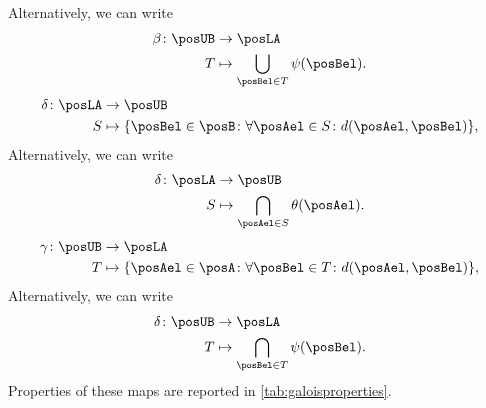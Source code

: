 %
\noindent Alternatively, we can write
\begin{equation}
	\begin{aligned}
		\beta \colon \posUB & \to \posLA                                    \\
		T                   & \mapsto \bigcup_{\posBel\in T} \psi(\posBel).
	\end{aligned}
\end{equation}
%
\begin{equation}
	\label{eq:galoisdelta}
	\begin{aligned}
		\delta \colon \posLA & \to \posUB                                                                           \\
		S                    & \mapsto \{\posBel\in \posB \colon \forall {\posAel\in S}\colon d(\posAel,\posBel)\},
	\end{aligned}
\end{equation}
Alternatively, we can write
\begin{equation}
	\begin{aligned}
		\delta\colon \posLA & \to \posUB                                     \\
		S                   & \mapsto \bigcap_{\posAel\in S}\theta(\posAel).
	\end{aligned}
\end{equation}
%
\begin{equation}
	\label{eq:galoisgamma}
	\begin{aligned}
		\gamma \colon \posUB & \to \posLA                                                                           \\
		T                    & \mapsto \{\posAel\in \posA \colon \forall {\posBel\in T}\colon d(\posAel,\posBel)\},
	\end{aligned}
\end{equation}
Alternatively, we can write
\begin{equation}
	\begin{aligned}
		\delta\colon \posUB & \to \posLA                                   \\
		T                   & \mapsto \bigcap_{\posBel\in T}\psi(\posBel).
	\end{aligned}
\end{equation}
%
Properties of these maps are reported in \cref{tab:galoisproperties}.

